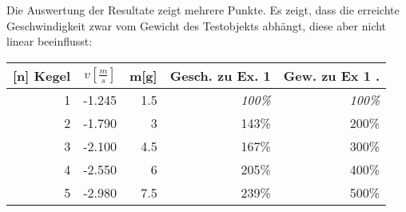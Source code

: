 Die Auswertung der Resultate zeigt mehrere Punkte. Es zeigt, dass die erreichte Geschwindigkeit zwar vom Gewicht des Testobjekts abhängt, diese aber nicht linear beeinflusst:

\begin{tabular}{rrrrr}
	\textbf{[n] Kegel} & \(v[\frac{m}{s}]\) & m[g] & Gesch. zu Ex. 1 & Gew. zu Ex 1 .\\ \hline
	1 & -1.245 & 1.5 & \textit{100\%} & \textit{100\%} \\
	2 & -1.790 & 3   & 143\% & 200\%\\
	3 & -2.100 & 4.5 & 167\% & 300\% \\
	4 & -2.550 & 6   & 205\% & 400\% \\
	5 & -2.980 & 7.5 & 239\% & 500\%\\
\end{tabular}